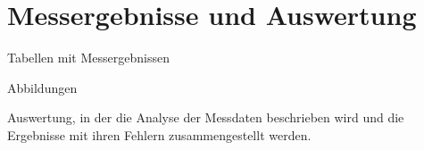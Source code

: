 \section{Messergebnisse und Auswertung}
Tabellen mit Messergebnissen

Abbildungen

Auswertung, in der die Analyse der Messdaten beschrieben wird und die Ergebnisse mit ihren Fehlern zusammengestellt werden.